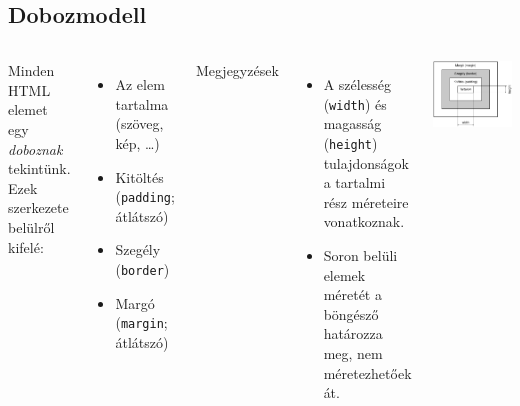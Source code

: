 \subsection{Dobozmodell}

\begin{frame}
  \begin{columns}[c]
      Minden HTML elemet egy \emph{doboznak} tekintünk. Ezek szerkezete belülről kifelé:
      \begin{itemize}
        \item Az elem tartalma (szöveg, kép, \dots)
        \item Kitöltés (\texttt{padding}; átlátszó)
        \item Szegély (\texttt{border})
        \item Margó (\texttt{margin}; átlátszó)
      \end{itemize}
      \vfill
      Megjegyzések
      \begin{itemize}
        \item A szélesség (\texttt{width}) és magasság (\texttt{height}) 
      tulajdonságok a tartalmi rész méreteire vonatkoznak.
        \item Soron belüli elemek méretét a böngésző határozza 
        meg, nem méretezhetőek át.
      \end{itemize}
      \includegraphics[width=\textwidth]{doboz.pdf}
  \end{columns} 
\end{frame}

